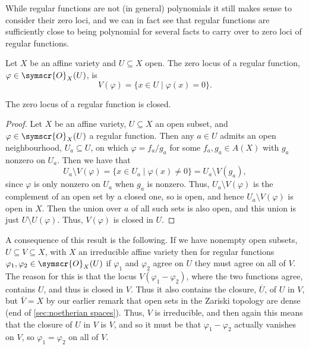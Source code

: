 \documentclass[fleqn]{NotesClass}
\newcommand{\sheaf}[1]{\symscr{#1}}
\begin{document}
    While regular functions are not (in general) polynomials it still makes sense to consider their zero loci, and we can in fact see that regular functions are sufficiently close to being polynomial for several facts to carry over to zero loci of regular functions.
    
    \begin{dfn}{}{}
        Let \(X\) be an affine variety and \(U \subseteq X\) open.
        The zero locus of a regular function, \(\varphi \in \sheaf{O}_X(U)\), is
        \begin{equation}
            V(\varphi) = \{x \in U \mid \varphi(x) = 0\}.
        \end{equation}
    \end{dfn}
    
    \begin{lma}{}{}
        The zero locus of a regular function is closed.
        \begin{proof}
            Let \(X\) be an affine variety, \(U \subseteq X\) an open subset, and \(\varphi \in \sheaf{O}_X(U)\) a regular function.
            Then any \(a \in U\) admits an open neighbourhood, \(U_a \subseteq U\), on which \(\varphi = f_a/g_a\) for some \(f_a, g_a \in A(X)\) with \(g_a\) nonzero on \(U_a\).
            Then we have that
            \begin{equation}
                U_a \setminus V(\varphi) = \{x \in U_a \mid \varphi(x) \ne 0\} = U_a \setminus V(g_a),
            \end{equation}
            since \(\varphi\) is only nonzero on \(U_a\) when \(g_a\) is nonzero.
            Thus, \(U_a \setminus V(\varphi)\) is the complement of an open set by a closed one, so is open, and hence \(U_a \setminus V(\varphi)\) is open in \(X\).
            Then the union over \(a\) of all such sets is also open, and this union is just \(U \setminus U(\varphi)\).
            Thus, \(V(\varphi)\) is closed in \(U\).
        \end{proof}
    \end{lma}
    
    A consequence of this result is the following.
    If we have nonempty open subsets, \(U \subseteq V \subseteq X\), with \(X\) an irreducible affine variety then for regular functions \(\varphi_1, \varphi_2 \in \sheaf{O}_X(U)\) if \(\varphi_1\) and \(\varphi_2\) agree on \(U\) they must agree on all of \(V\).
    The reason for this is that the locus \(V(\varphi_1 - \varphi_2)\), where the two functions agree, contains \(U\), and thus is closed in \(V\).
    Thus it also contains the closure, \(\overline{U}\), of \(U\) in \(V\), but \(\overline{V} = X\) by our earlier remark that open sets in the Zariski topology are dense (end of \cref{sec:noetherian spaces}).
    Thus, \(V\) is irreducible, and then again this means that the closure of \(U\) in \(V\) is \(V\), and so it must be that \(\varphi_1 - \varphi_2\) actually vanishes on \(V\), so \(\varphi_1 = \varphi_2\) on all of \(V\).
    
\end{document}
